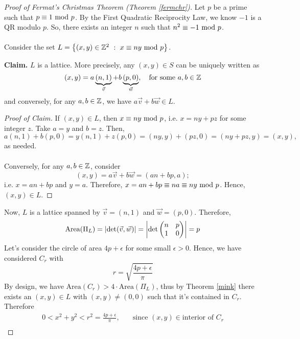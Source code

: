 
\begin{proof}[Proof of Fermat's Christmas Theorem (Theorem \ref{fermchr})]
Let $p$ be a prime such that $p \equiv 1 \text{ mod }{p}$. By the First Quadratic Reciprocity Law, we know $-1$ is a QR modulo $p$. So, there exists an integer $n$ such that $n^2 \equiv -1 \text{ mod }{p}$.\\
\\
Consider the set $L = \left\{(x,y) \in \mathbb Z^2\ :\ x \equiv ny \text{ mod }{p}\right\}$.\\[0.5em]
\begin{subproof}
{\bf Claim.} $L$ is a lattice. More precisely, any $(x,y) \in S$ can be uniquely written as
\[(x,y) = a\underbrace{(n,1)}_{\vec{v}} + b\underbrace{(p,0)}_{\vec{w}},\quad \text{for some } a,b \in \mathbb Z\]
and conversely, for any $a,b \in \mathbb Z$, we have $a\vec{v} + b\vec{w} \in L$.
\begin{proof}[Proof of Claim]
If $(x,y) \in L$, then $x \equiv ny \text{ mod }{p}$, i.e. $x = ny + pz$ for some integer $z$. Take $a = y$ and $b = z$. Then,
\[a(n,1) + b(p,0) = y(n,1) + z(p,0) = (ny,y) + (pz,0) = (ny + pz,y) = (x,y),\]
as needed.\\
\\
Conversely, for any $a,b \in \mathbb Z$, consider
\[(x,y) = a\vec{v} + b\vec{w} = (an + bp,a);\]
i.e. $x = an + bp$ and $y = a$. Therefore, $x = an + bp \equiv na\equiv ny \text{ mod }{p}$. Hence, $(x,y) \in L$.
\end{proof}
\vspace*{0.05ex}
\end{subproof}
\vspace*{1.5em}
Now, $L$ is a lattice spanned by $\vec{v} = (n,1)$ and $\vec{w} = (p,0)$. Therefore, 
\[\mathrm{Area}(\Pi_L) = \left\lvert\det(\vec{v},\vec{w})\right\rvert = \left\lvert\det\begin{pmatrix}n & p\\ 1 & 0 \end{pmatrix}\right\rvert = p\]
Let's consider the circle of area $4p + \epsilon$ for some small $\epsilon > 0$. Hence, we have considered $C_r$ with
\[r = \sqrt{\frac{4p + \epsilon}{\pi}}\]
By design, we have $\mathrm{Area}(C_r) > 4\cdot\mathrm{Area}(\Pi_L)$, thus by Theorem \ref{mink} there exists an $(x,y) \in L$ with $(x,y) \neq (0,0)$ such that it's contained in $C_r$. Therefore
\begin{align*}
0 < x^2 + y^2 < r^2 = \frac{4p + \epsilon}{\pi}, &\quad \text{since }(x,y) \in \text{interior of }C_r\\[0.5em]

\end{align*}
\end{proof}
